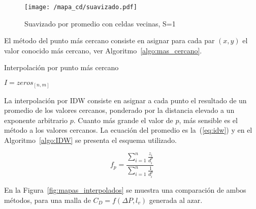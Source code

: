 \begin{figure}[h!]
    \centering
    \texttt{[image: /mapa\_cd/suavizado.pdf]}
    \caption{Suavizado por promedio con celdas vecinas, S=1}\label{fig:suavizado_promedio}
\end{figure}


El método del punto más cercano consiste en asignar para cada par $(x, y)$ el
valor conocido más cercano, ver Algoritmo~\ref{algo:mas_cercano}.

\begin{algorithm}
 \caption{Interpolación por punto más cercano}\label{algo:mas_cercano}


    \BlankLine
     $I=zeros_{[n,m]}$\;
\end{algorithm}

La interpolación por IDW consiste en asignar a cada punto el resultado de un
promedio de los valores cercanos, ponderado por la distancia elevado a un
exponente arbitrario $p$.
%
Cuanto más grande el valor de $p$, más sensible es el método a los valores
cercanos.
%
La ecuación del promedio es la~(\ref{eq:idw}) y en el Algoritmo~\ref{algo:IDW}
se presenta el esquema utilizado.
%

\begin{equation} \label{eq:idw}
    f_p = \frac{\sum_{i=1}^{n} \frac{z_i}{d_i^p}} {\sum_{i=1}^{n}
    \frac{1}{d_i^p}}
\end{equation}

En la Figura~\ref{fig:mapas_interpolados} se muestra una comparación de ambos
métodos, para una malla de $C_{D}=f(\Delta P, l_{v})$ generada al azar.

